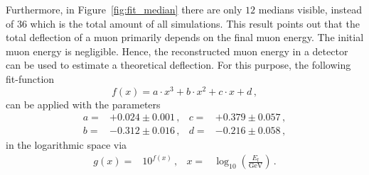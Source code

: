 Furthermore, in Figure~\ref{fig:fit_median} there are only $12$ medians visible, 
instead of $36$ which is the total amount of all simulations. This result points 
out that the total deflection of a muon 
primarily depends on the final muon energy.
The initial muon energy is negligible. 
Hence, the reconstructed muon 
energy in a detector can be used to estimate a theoretical deflection. For this 
purpose, the following fit-function 
\begin{equation}
     f(x) = a \cdot x^3 + b \cdot x^2 + c \cdot x + d \,,
    \label{eqn:fit_median}
\end{equation}
can be applied with the parameters 
\begin{align}
    a =& +0.024 \pm 0.001\,,  & c =& +0.379 \pm 0.057\,,\\
    b =& -0.312 \pm 0.016\,,  & d =& -0.216 \pm 0.058\,,
\end{align}
in the logarithmic space via 
\begin{align}
    g(x) =& 10^{f(x)}\,, & x =& \log_{10}\left(\frac{E_{\text{f}}}{\si{\giga\electronvolt}}\right)\,.
\end{align}

